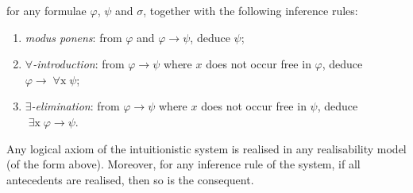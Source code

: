\documentclass[12pt,openany]{book}
\theoremstyle{plain}
\theoremstyle{definition}
\newcommand\uppar[1]{{\upshape(}#1{\upshape)}}
\newcommand\uplabel[1]{\textup{(#1)}}
\newcommand\opA[1]{\mathop{\forall #1}}
\newcommand\opE[1]{\mathop{\exists #1}}
\begin{document}
for any formulae $\varphi$, $\psi$ and $\sigma$, together with the following inference rules:
\begin{enumerate}[label=\uplabel{\roman*}]
  \item \emph{modus ponens}: from $\varphi$ and $\varphi \rightarrow \psi$, deduce $\psi$;
  \item \emph{$\forall$-introduction}: from $\varphi \rightarrow \psi$ where $x$ does not occur free in $\varphi$, deduce $\varphi \rightarrow \opA{x} \psi$;
  \item \emph{$\exists$-elimination}: from $\varphi \rightarrow \psi$ where $x$ does not occur free in $\psi$, deduce $\opE{x} \varphi \rightarrow \psi$.
\end{enumerate}

\begin{proposition}
  \label{prop:real-con-int-logic}
  Any logical axiom of the intuitionistic system is realised in any realisability model \uppar{of the form above}. Moreover, for any inference rule of the system, if all antecedents are realised, then so is the consequent.
\end{proposition}
\end{document}

